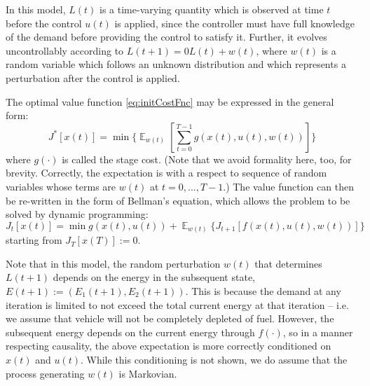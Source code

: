 \documentclass[conference]{IEEEtran}
\DeclareMathOperator{\E}{\mathbb{E}}
\begin{document}

In this model, $L(t)$ is a time-varying quantity which is observed at time $t$ before the control $u(t)$ is applied, since the controller must have full knowledge of the demand before providing the control to satisfy it. Further, it evolves uncontrollably according to $L(t+1)=0L(t)+w(t)$, where $w(t)$ is a random variable which follows an unknown distribution and which represents a perturbation after the control is applied. %

The optimal value function \eqref{eq:initCostFnc} may be expressed in the general form:
\begin{equation}J^{*}[x(t)]=\min \Biggl\{\mathop{\E}_{w(t)}\left[\sum_{t=0}^{T-1}g(x(t),u(t),w(t))\right]\Biggr\}\end{equation}
where $g(\cdot)$ is called the stage cost. (Note that we avoid formality here, too, for brevity. Correctly, the expectation is with a respect to sequence of random variables whose terms are $w(t)$ at $t=0,...,T-1$.) The value function can then be re-written in the form of Bellman's equation, which allows the problem to be solved by dynamic programming:
\begin{displaymath}
J_{t}[x(t)]=\min g(x(t),u(t)) + \mathop{\E}_{w(t)} \{J_{t+1}[f(x(t),u(t),w(t))]\}
\end{displaymath}
starting from $J_{T}[x(T)]:=0$.

Note that in this model, the random perturbation $w(t)$ that determines $L(t+1)$ depends on the energy in the subsequent state, $E(t+1):=(E_{1}(t+1),E_{2}(t+1))$. This is because the demand at any iteration is limited to not exceed the total current energy at that iteration -- i.e. we assume that vehicle will not be completely depleted of fuel. However, the subsequent energy depends on the current energy through $f(\cdot)$, so in a manner respecting causality, the above expectation is more correctly conditioned on $x(t)$ and $u(t)$. While this conditioning is not shown, we do assume that the process generating $w(t)$ is Markovian.
\end{document}
